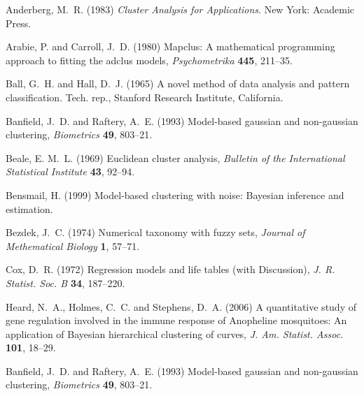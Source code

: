 \documentclass{roffin}
\begin{document}
\begin{thebibliography}{}

Anderberg, M.~R. (1983)
\textit{Cluster Analysis for Applications}.
 New York: Academic Press.

Arabie, P.  and  Carroll, J.~D. (1980)
 Mapclus: A mathematical programming approach to fitting the adclus
  models,
 \textit{Psychometrika} \textbf{445}, 211--35.

Ball, G.~H.  and  Hall, D.~J. (1965)
 A novel method of data analysis and pattern classification.
 Tech. rep., Stanford Research Institute, California.

Banfield, J.~D.  and  Raftery, A.~E. (1993)
 Model-based gaussian and non-gaussian clustering,
 \textit{Biometrics} \textbf{49}, 803--21.

Beale, E. M.~L. (1969)
 Euclidean cluster analysis,
 \textit{Bulletin of the International Statistical Institute}
  \textbf{43}, 92--94.

Bensmail, H. (1999)
 Model-based clustering with noise: Bayesian inference and estimation.

Bezdek, J.~C. (1974)
 Numerical taxonomy with fuzzy sets,
 \textit{Journal of Methematical Biology} \textbf{1}, 57--71.

Cox, D.~R. (1972)
 {Regression models and life tables (with Discussion)},
 \textit{J. R. Statist. Soc. B} \textbf{34}, 187--220.

Heard, N.~A., Holmes, C.~C.  and  Stephens, D.~A.
  (2006)
 A quantitative study of gene regulation involved in the immune
  response of {A}nopheline mosquitoes: {A}n application of {B}ayesian
  hierarchical clustering of curves,
 \textit{J. Am. Statist. Assoc.} \textbf{101}, 18--29.

Banfield, J.~D.  and  Raftery, A.~E. (1993)
    Model-based gaussian and non-gaussian clustering,
    \textit{Biometrics} \textbf{49}, 803--21.
\end{thebibliography}
\end{document}
